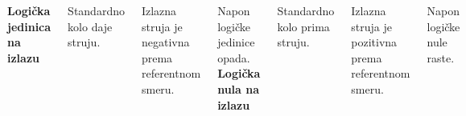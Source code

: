 \begin{frame}[label=08-s029]
\begin{columns}[T,onlytextwidth]
\textbf{Logička jedinica na izlazu}\par\medskip
\centering\par\medskip\raggedright
\alert{Standardno} kolo daje struju.\par
Izlazna struja je negativna prema referentnom smeru.\par
Napon logičke jedinice opada.
\textbf{Logička nula na izlazu}\par\medskip
\centering\par\medskip\raggedright
\alert{Standardno} kolo prima struju.\par
Izlazna struja je pozitivna prema referentnom smeru.\par
Napon logičke nule raste.
\end{columns}
\end{frame}
